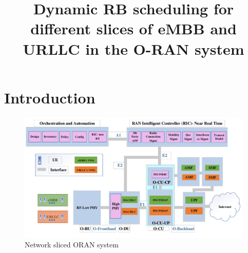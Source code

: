 \documentclass[conference]{IEEEtran}
\begin{document}
\title{Dynamic RB scheduling for different slices of eMBB and URLLC in the O-RAN system \vspace{-.1cm}
}
%

\maketitle

\begin{abstract}

\end{abstract}
\section{Introduction} 

\begin{figure}
  \centering 
    \includegraphics[scale = 0.5]{finalDraw1.pdf}
  \caption{Network sliced ORAN system}
  \label{fig:1}
\end{figure}
\end{document}

